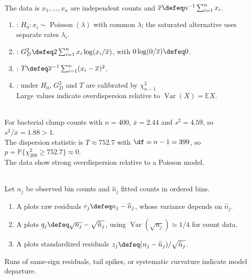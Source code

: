 \begin{definition} \label{def:poisson-dispersion-test} \\
The data is $x_1,\ldots,x_n$ are independent counts and $\overline{x}\defeq n^{-1}\sum_{i=1}^nx_i$.
\begin{enumerate}[label=(\roman*)]
\setlength{\itemsep}{0pt}
\item {}: $H_0:x_i\sim\operatorname{Poisson}(\lambda)$ with common $\lambda$; the saturated alternative uses separate rates $\lambda_i$.
\item {}: $G_D^2\defeq2\sum_{i=1}^nx_i\log(x_i/\overline{x})$, with $0\log(0/\overline{x})\defeq0$.
\item {}: $T\defeq\overline{x}^{-1}\sum_{i=1}^n(x_i-\overline{x})^2$.
\item {}: under $H_0$, $G_D^2$ and $T$ are calibrated by $\chi^2_{n-1}$\\
Large values indicate overdispersion relative to $\operatorname{Var}(X)=\mathbb{E}X$.
\end{enumerate}
\end{definition}

\begin{example} \label{ex:bacterial-clumps-dispersion} \\
For bacterial clump counts with $n=400$, $\overline{x}=2.44$ and $s^2=4.59$, so $s^2/\overline{x}=1.88>1$.\\
The dispersion statistic is $T\approx752.7$ with $\df=n-1=399$, so $p=\mathbb{P}\{\chi^2_{399}\geq752.7\}\approx0$.\\
The data show strong overdispersion relative to a Poisson model.
\end{example}

\begin{definition} \label{def:hanging-rootogram-and-chigram} \\
Let $n_j$ be observed bin counts and $\widehat n_j$ fitted counts in ordered bins.
\begin{enumerate}[label=(\roman*)]
\setlength{\itemsep}{0pt}
\item A  plots raw residuals $r_j\defeq n_j-\widehat n_j$, whose variance depends on $\widehat n_j$.
\item A  plots $q_j\defeq\sqrt{n_j}-\sqrt{\widehat n_j}$, using $\operatorname{Var}(\sqrt{n_j})\approx1/4$ for count data.
\item A  plots standardized residuals $z_j\defeq(n_j-\widehat n_j)/\sqrt{\widehat n_j}$.
\end{enumerate}
Runs of same-sign residuals, tail spikes, or systematic curvature indicate model departure.
\end{definition}

